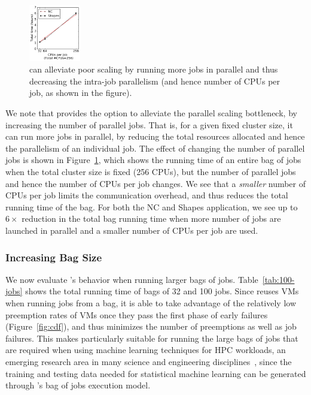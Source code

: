 \begin{figure}
  \includegraphics[width=0.2\textwidth]{../graphs/par-scaling.pdf}
      \vspace*{\myfigspace}
  \caption{\sysname can alleviate poor scaling by running more jobs in parallel and thus decreasing the intra-job parallelism (and hence number of CPUs per job, as shown in the figure).}
  \label{fig:par-scaling}
    \vspace*{\myfigspace}
\end{figure}


We note that \sysname provides the option to alleviate the parallel scaling bottleneck, by increasing the number of parallel jobs.
That is, for a given fixed cluster size, it can run more jobs in parallel, by reducing the total resources allocated and hence the parallelism 
of an individual job. 
The effect of changing the number of parallel jobs is shown in Figure~\ref{fig:par-scaling}, which shows the running time of an entire bag of jobs when the total cluster size is fixed (256 CPUs), but the number of parallel jobs and hence the number of CPUs per job changes.
We see that a \emph{smaller} number of CPUs per job limits the communication overhead, and thus reduces the total running time of the bag.
For both the NC and Shapes application, we see up to $6\times$ reduction in the total bag running time when more number of jobs are launched in parallel and a smaller number of CPUs per job are used. 


\subsubsection{Increasing Bag Size}

We now evaluate \sysname's behavior when running larger bags of jobs.
Table~\ref{tab:100-jobs} shows the total running time of bags of 32 and 100 jobs.
Since \sysname reuses VMs when running jobs from a bag, it is able to take advantage of the relatively low preemption rates of VMs once they pass the first phase of early failures (Figure~\ref{fig:cdf}), and thus minimizes the number of preemptions as well as job failures. 
This makes \sysname particularly suitable for running the large bags of jobs that are required when using machine learning techniques for HPC workloads, an emerging research area in many science and engineering disciplines~\cite{ml.atomic2017,melko2017,sam2017,fu2017,long2015machine,ferguson2017machine,ward2018matminer,jcs1,jcs2,fox2019learning}, since the training and testing data needed for statistical machine learning can be generated through \sysname's bag of jobs execution model. 


